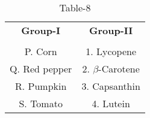\begin{table}[htbp]
  \centering
  \caption{Table-8}
  \label{tab:tables/table8.tex}
  \begin{tabular}{cc}
  \textbf{Group-I} & \textbf{Group-II} \\ \\
    P. Corn & 1. Lycopene \\
    Q. Red pepper & 2. $\beta$-Carotene \\
    R. Pumpkin & 3. Capsanthin \\
    S. Tomato & 4. Lutein \\
  \end{tabular}
\end{table}